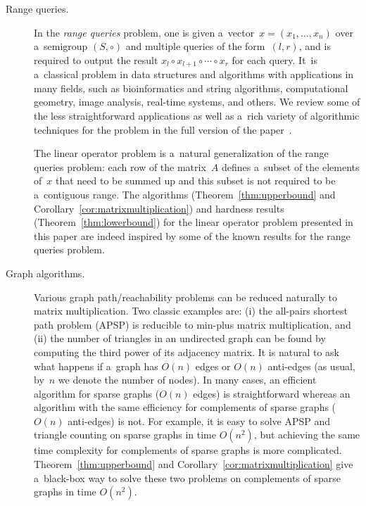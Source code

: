 \documentclass[a4paper,UKenglish,cleveref, autoref]{lipics-v2019}
\begin{document}
\begin{description}
\item[Range queries.] In the \emph{range queries} problem,
one is given a~vector~$x=(x_1, \dotsc, x_n)$ over a~semigroup $(S, \circ)$ and
multiple queries of the form~$(l,r)$, and is required to
output the result $x_l \circ x_{l+1} \circ \dotsb \circ x_r$
for each query. It~is a~classical problem in data structures and
algorithms with applications in many fields, such as bioinformatics and
string algorithms, computational geometry, image analysis, real-time
systems, and others. 
We review some of the less straightforward applications
as well as a~rich variety of algorithmic techniques for the problem in the full version of the paper~\cite{DBLP:journals/eccc/KulikovMMP19}.


The linear operator problem is a~natural generalization of the range queries
problem: each row of the matrix~$A$ defines a~subset of the elements of~$x$
that need to be summed up and this subset is not required to be
a~contiguous range. The algorithms (Theorem~\ref{thm:upperbound} and
Corollary~\ref{cor:matrixmultiplication}) and hardness results
(Theorem~\ref{thm:lowerbound}) for the linear operator problem presented in this
paper are indeed inspired by some of the known results for the range queries
problem.

\item[Graph algorithms.] Various graph path/reachability
problems can be reduced naturally to matrix multiplication.
Two classic examples are: (i) the all-pairs shortest path problem (APSP) is
reducible to min-plus matrix multiplication, and (ii) the number of triangles
in an undirected graph can be found by computing the third power of its
adjacency matrix.
It is natural to ask what happens if
a~graph has $O(n)$ edges or $O(n)$ anti-edges
(as usual, by~$n$ we denote the number of nodes).
In many cases, an efficient algorithm
for sparse graphs ($O(n)$ edges) is straightforward
whereas an algorithm with the same efficiency
for complements of sparse graphs ($O(n)$ anti-edges) is not. For
example, it is easy to solve APSP and triangle counting on sparse graphs in
time $O(n^2)$, but achieving the same time complexity for complements of sparse
graphs is more complicated.
Theorem~\ref{thm:upperbound} and Corollary~\ref{cor:matrixmultiplication} give a~black-box way to solve these two problems on complements of sparse graphs in time $O(n^2)$.


\end{description}
\end{document}
